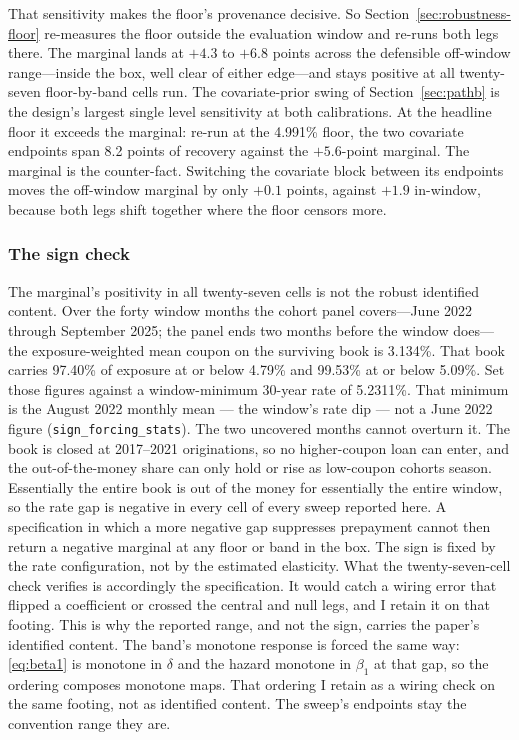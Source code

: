 \documentclass[12pt]{article}
\begin{document}
That sensitivity makes the floor's provenance decisive. So Section~\ref{sec:robustness-floor} re-measures the floor outside the evaluation window and re-runs both legs there. The marginal lands at $+4.3$ to $+6.8$ points across the defensible off-window range---inside the box, well clear of either edge---and stays positive at all twenty-seven floor-by-band cells run. The covariate-prior swing of Section~\ref{sec:pathb} is the design's largest single level sensitivity at both calibrations. At the headline floor it exceeds the marginal: re-run at the 4.991\% floor, the two covariate endpoints span 8.2 points of recovery against the $+5.6$-point marginal. The marginal is the counter-fact. Switching the covariate block between its endpoints moves the off-window marginal by only $+0.1$ points, against $+1.9$ in-window, because both legs shift together where the floor censors more.

\subsubsection{The sign check}

The marginal's positivity in all twenty-seven cells is not the robust identified content. Over the forty window months the cohort panel covers---June 2022 through September 2025; the panel ends two months before the window does---the exposure-weighted mean coupon on the surviving book is 3.134\%. That book carries 97.40\% of exposure at or below 4.79\% and 99.53\% at or below 5.09\%. Set those figures against a window-minimum 30-year rate of 5.2311\%. That minimum is the August 2022 monthly mean --- the window's rate dip --- not a June 2022 figure (\texttt{sign\_forcing\_stats}). The two uncovered months cannot overturn it. The book is closed at 2017--2021 originations, so no higher-coupon loan can enter, and the out-of-the-money share can only hold or rise as low-coupon cohorts season. Essentially the entire book is out of the money for essentially the entire window, so the rate gap is negative in every cell of every sweep reported here. A specification in which a more negative gap suppresses prepayment cannot then return a negative marginal at any floor or band in the box. The sign is fixed by the rate configuration, not by the estimated elasticity. What the twenty-seven-cell check verifies is accordingly the specification. It would catch a wiring error that flipped a coefficient or crossed the central and null legs, and I retain it on that footing. This is why the reported range, and not the sign, carries the paper's identified content. The band's monotone response is forced the same way: \eqref{eq:beta1} is monotone in $\delta$ and the hazard monotone in $\beta_1$ at that gap, so the ordering composes monotone maps. That ordering I retain as a wiring check on the same footing, not as identified content. The sweep's endpoints stay the convention range they are.
\end{document}
